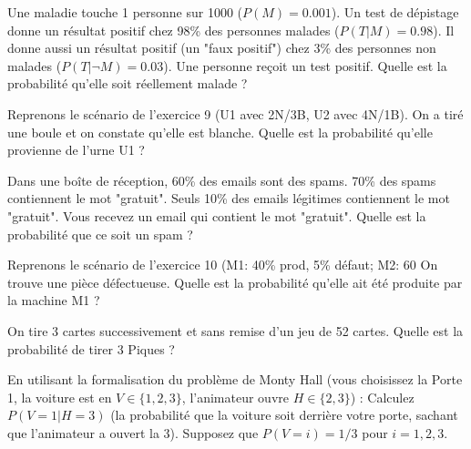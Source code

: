 
\begin{exercicebox}
Une maladie touche 1 personne sur 1000 ($P(M)=0.001$). Un test de dépistage donne un résultat positif chez 98\% des personnes malades ($P(T|M)=0.98$). Il donne aussi un résultat positif (un "faux positif") chez 3\% des personnes non malades ($P(T|\neg M)=0.03$).
Une personne reçoit un test positif. Quelle est la probabilité qu'elle soit réellement malade ?
\end{exercicebox}

\begin{exercicebox}
Reprenons le scénario de l'exercice 9 (U1 avec 2N/3B, U2 avec 4N/1B).
On a tiré une boule et on constate qu'elle est blanche. Quelle est la probabilité qu'elle provienne de l'urne U1 ?
\end{exercicebox}

\begin{exercicebox}
Dans une boîte de réception, 60\% des emails sont des spams. 70\% des spams contiennent le mot "gratuit". Seuls 10\% des emails légitimes contiennent le mot "gratuit".
Vous recevez un email qui contient le mot "gratuit". Quelle est la probabilité que ce soit un spam ?
\end{exercicebox}

\begin{exercicebox}
Reprenons le scénario de l'exercice 10 (M1: 40\% prod, 5\% défaut; M2: 60%
On trouve une pièce défectueuse. Quelle est la probabilité qu'elle ait été produite par la machine M1 ?
\end{exercicebox}


\begin{exercicebox}
On tire 3 cartes successivement et sans remise d'un jeu de 52 cartes.
Quelle est la probabilité de tirer 3 Piques ?
\end{exercicebox}

\begin{exercicebox}
En utilisant la formalisation du problème de Monty Hall (vous choisissez la Porte 1, la voiture est en $V \in \{1, 2, 3\}$, l'animateur ouvre $H \in \{2, 3\}$) :
Calculez $P(V=1 | H=3)$ (la probabilité que la voiture soit derrière votre porte, sachant que l'animateur a ouvert la 3). Supposez que $P(V=i)=1/3$ pour $i=1,2,3$.
\end{exercicebox}

